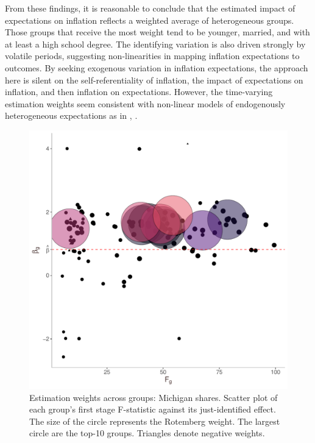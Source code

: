 \documentclass[12pt]{article}
\begin{document}
From these findings, it is reasonable to conclude that the estimated impact of expectations on inflation reflects a weighted average of heterogeneous groups. Those groups that receive the most weight tend to be younger, married, and with at least a high school degree. The identifying variation is also driven strongly by volatile periods, suggesting non-linearities in mapping inflation expectations to outcomes. By seeking exogenous variation in inflation expectations, the approach here is silent on the self-referentiality of inflation, the impact of expectations on inflation, and then inflation on expectations. However, the time-varying estimation weights seem consistent with non-linear models of endogenously heterogeneous expectations as in \cite{BranchEJ2004}, \cite{BrockHommesEconometrica1997}.




\begin{figure}
\centering
\caption{Estimation weights across groups: Michigan shares. Scatter plot of each group's first stage F-statistic against its just-identified effect. The size of the circle represents the Rotemberg weight. The largest circle are the top-10 groups. Triangles denote negative weights.}\label{fig:rotweights:group}
\includegraphics[height=.85\textwidth, width = .85\textwidth]{figs/weightsout}
\end{figure}
\end{document}
